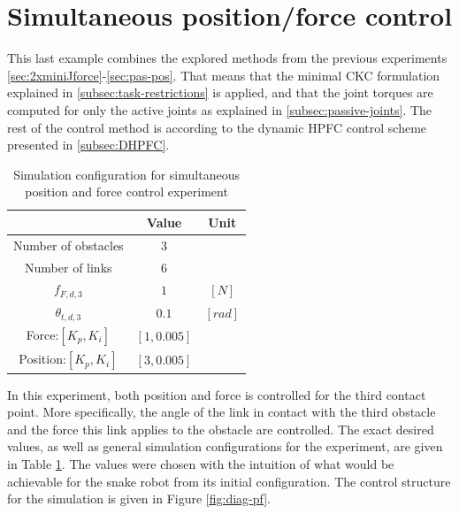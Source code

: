 \section{Simultaneous position/force control}\label{sec:pos-force-control-exp}

This last example combines the explored methods from the previous experiments \ref{sec:2xminiJforce}-\ref{sec:pas-pos}. That means that the minimal CKC formulation explained in \ref{subsec:task-restrictions} is applied, and that the joint torques are computed for only the active joints as explained in \ref{subsec:passive-joints}. The rest of the control method is according to the dynamic HPFC control scheme presented in \ref{subsec:DHPFC}.

\begin{table}[h!]
    \centering
    \begin{tabular}{|c|c|c|}
        \hline
        & \textbf{Value} & \textbf{Unit}\\
        \hline \hline
        Number of obstacles & $3$ & \\
        Number of links & $6$ & \\
        $f_{F,d,3}$ & $1$ & $[N]$ \\
        $\theta_{t,d,3}$ & $0.1$ & $[rad]$ \\
        Force:$[K_{p}, K_{i}]$ & $[1, 0.005]$ &\\
        Position:$[K_{p}, K_{i}]$ & $[3, 0.005]$ &\\
        \hline
    \end{tabular}
    \caption{Simulation configuration for simultaneous position and force control experiment}
    \label{tab:p+f}
\end{table}

In this experiment, both position and force is controlled for the third contact point. More specifically, the angle of the link in contact with the third obstacle and the force this link applies to the obstacle are controlled. The exact desired values, as well as general simulation configurations for the experiment, are given in Table \ref{tab:p+f}. The values were chosen with the intuition of what would be achievable for the snake robot from its initial configuration. The control structure for the simulation is given in Figure \ref{fig:diag-pf}.

